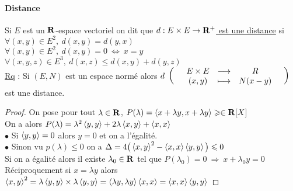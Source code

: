 		\paragraph{Distance}
			Si $E$ est un $\R$-espace vectoriel on dit que \uline{$d: E\times E\to \R^+$ est une distance} si \\
			\hspace*{2cm} \un $\forall (x,y)\in E^2 ,~d(x,y)=d(y,x)$\\
			\hspace*{2cm} \deux $\forall (x,y)\in E^2,~ d(x,y)=0 ~\Leftrightarrow~x=y$\\
			\hspace*{2cm} \trois $\forall (x,y,z)\in E^3 ,~d(x,z)\leqslant d(x,y)+d(y,z)$ \trait \vspace*{-1cm} \\
		\uline{Rq} : Si $(E,N)$ est un espace normé alors $d~\appli{E\times E}{(x,y)}{R}{N(x-y)}$ est une distance.
		\vspace*{0.5cm} \\ 
		\begin{proof}
		On pose pour tout $\lambda\in\R$, $P(\lambda) = \scal{x+\lambda y,x+\lambda y} \geqslant \in \R[X]$\\
		On a alors $P(\lambda) = \lambda^2 \scal{y,y} + 2\lambda \scal{x,y} + \scal{x,x}$\\
		\hspace*{2cm} $\bullet$ Si $\scal{y,y}=0$ alors $y=0$ et on a l'égalité.\\
		\hspace*{2cm} $\bullet$ Sinon vu $p(\lambda) \leqslant 0$ on a $\Delta =4\big(\scal{x,y}^2 - \scal{x,x}\scal{y,y} \big) \leqslant 0$ \\
		Si on a égalité alors il existe $\lambda_0\in\R$ tel que $P(\lambda_0) = 0 ~\Rightarrow~x+\lambda_0 y = 0$\\
		Réciproquement si $x=\lambda y$ alors $\scal{x,y}^2 = \lambda\scal{y,y}\times\lambda\scal{y,y} = \scal{\lambda y,\lambda y}\scal{x,x} = \scal{x,x}\scal{y,y}$ 
		\end{proof}
		${}$ \\ 
